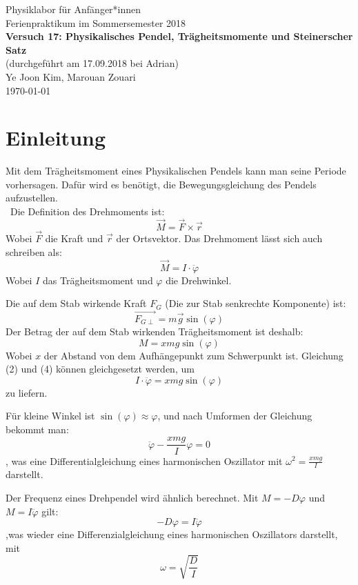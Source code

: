 \documentclass[11pt,a4paper]{article} %
\begin{document}
{
	\centering 
	\large 
	Physiklabor für Anfänger*innen \\
	Ferienpraktikum im Sommersemester 2018 \\[4mm]
	\textbf{\LARGE 
		Versuch 17: Physikalisches Pendel, Trägheitsmomente und Steinerscher Satz
	} \\[3mm]
	(durchgeführt am 17.09.2018 bei Adrian) \\
	Ye Joon Kim, Marouan Zouari\\
	\today \\[10mm]
}
\tableofcontents
\newpage
\section{Einleitung}
Mit dem Trägheitsmoment eines Physikalischen Pendels kann man seine Periode vorhersagen. Dafür wird es benötigt, die Bewegungsgleichung des Pendels aufzustellen. 
\\\
Die Definition des Drehmoments ist:
\begin{equation}
\vec{M} = \vec{F}\times \vec{r}
\end{equation}
Wobei $\vec{F}$ die Kraft und $\vec{r}$ der Ortsvektor. Das Drehmoment lässt sich auch schreiben als:
\begin{equation}
\vec{M} = I \cdot \ddot{\varphi}
\end{equation}
Wobei $I$ das Trägheitsmoment und $\varphi$ die Drehwinkel. 

Die auf dem Stab wirkende Kraft $F_G$ (Die zur Stab  senkrechte Komponente) ist:
\begin{equation}
\vec{F_{G\perp}} = m\vec{g}\sin(\varphi)
\end{equation}
Der Betrag der auf dem Stab wirkenden Trägheitsmoment ist deshalb:
\begin{equation}
M = xmg\sin(\varphi)
\end{equation}
Wobei $x$ der Abstand von dem Aufhängepunkt zum Schwerpunkt ist. Gleichung (2) und (4) können gleichgesetzt werden, um
$$ I \cdot \ddot{\varphi} = xmg\sin(\varphi)$$ 
zu liefern. 

Für kleine Winkel ist $\sin(\varphi) \approx \varphi$, und nach Umformen der Gleichung bekommt man:
$$ \ddot{\varphi} - \frac{xmg}{I} \varphi = 0$$
, was eine Differentialgleichung eines harmonischen Oszillator mit $\omega^2 = \frac{xmg}{I}$ darstellt. 

Der Frequenz eines Drehpendel wird ähnlich berechnet. Mit $M = -D\varphi$ und $M = I\ddot{\varphi}$ gilt:
$$-D\varphi = I\ddot{\varphi}$$
,was wieder eine Differenzialgleichung eines harmonischen Oszillators darstellt, mit 
\begin{equation}
\omega = \sqrt{\frac{D}{I}}
\end{equation}
\end{document}
